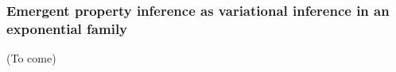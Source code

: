 \documentclass[11pt]{article}
\DeclareMathOperator*{\argmin}{argmin}
\begin{document}
\subsubsection{Emergent property inference as variational inference in an exponential family}\label{methods_VI}
(To come) \\
\end{document}
